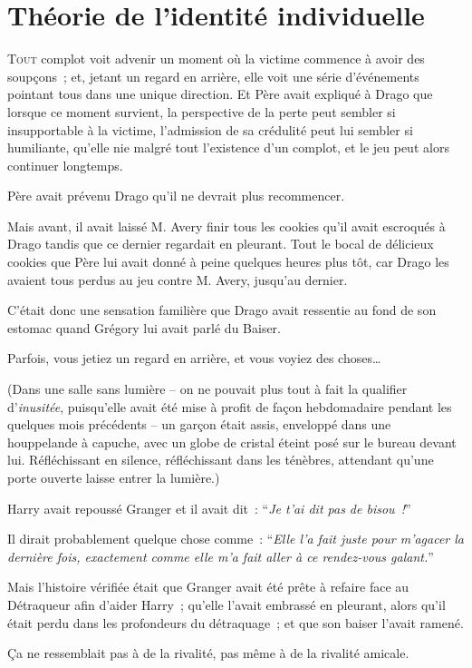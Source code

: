 \chapter{Théorie de l'identité individuelle}

\lettrine{T}{out} complot voit advenir un moment où la victime commence à avoir des soupçons~; et, jetant un regard en arrière, elle voit une série d'événements pointant tous dans une unique direction.
Et Père avait expliqué à Drago que lorsque ce moment survient, la perspective de la perte peut sembler si insupportable à la victime, l'admission de sa crédulité peut lui sembler si humiliante, qu'elle nie malgré tout l'existence d'un complot, et le jeu peut alors continuer longtemps.

Père avait prévenu Drago qu'il ne devrait plus recommencer.

Mais avant, il avait laissé M. Avery finir tous les cookies qu'il avait escroqués à Drago tandis que ce dernier regardait en pleurant.
Tout le bocal de délicieux cookies que Père lui avait donné à peine quelques heures plus tôt, car Drago les avaient tous perdus au jeu contre M. Avery, jusqu'au dernier.

C'était donc une sensation familière que Drago avait ressentie au fond de son estomac quand Grégory lui avait parlé du Baiser.

Parfois, vous jetiez un regard en arrière, et vous voyiez des choses…

(Dans une salle sans lumière -- on ne pouvait plus tout à fait la qualifier d'\emph{inusitée}, puisqu'elle avait été mise à profit de façon hebdomadaire pendant les quelques mois précédents -- un garçon était assis, enveloppé dans une houppelande à capuche, avec un globe de cristal éteint posé sur le bureau devant lui.
Réfléchissant en silence, réfléchissant dans les ténèbres, attendant qu'une porte ouverte laisse entrer la lumière.)

Harry avait repoussé Granger et il avait dit~: “\emph{Je t'ai dit pas de bisou~!}”

Il dirait probablement quelque chose comme~: “\emph{Elle l'a fait juste pour m'agacer la dernière fois, exactement comme elle m'a fait aller à ce rendez-vous galant.}”

Mais l'histoire vérifiée était que Granger avait été prête à refaire face au Détraqueur afin d'aider Harry~; qu'elle l'avait embrassé en pleurant, alors qu'il était perdu dans les profondeurs du détraquage~; et que son baiser l'avait ramené.

Ça ne ressemblait pas à de la rivalité, pas même à de la rivalité amicale.

